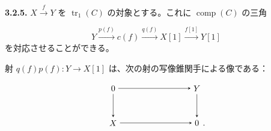 \noindent\textbf{3.2.5.}\quad
$X\xrightarrow{f}Y$ を $\operatorname{tr}_1(C)$ の対象とする。これに
$\operatorname{comp}(C)$ の三角

\begin{equation}
  Y\xrightarrow{p(f)}c(f)\xrightarrow{q(f)}X[1]
  \xrightarrow{f[1]}Y[1]
  \tag{3.2.5.1}
\end{equation}
を対応させることができる。

射 $q(f)p(f)\colon Y\longrightarrow X[1]$ は、次の射の写像錐関手による像である：

\begin{equation*}
  \begin{tikzpicture}[>=stealth,baseline=(current bounding box.center)]
    \node (Z1) at (0,1.45) {$0$};
    \node (Y)  at (3.5,1.45) {$Y$};
    \node (X)  at (0,0) {$X$};
    \node (Z2) at (3.5,0) {$0$};
    \node[anchor=base west,inner sep=0pt,xshift=.08em] at (Z2.base east) {$.$};
    \draw[->] (Z1) -- (Y);
    \draw[->] (Z1) -- (X);
    \draw[->] (Y) -- (Z2);
    \draw[->] (X) -- (Z2);
  \end{tikzpicture}
\end{equation*}
